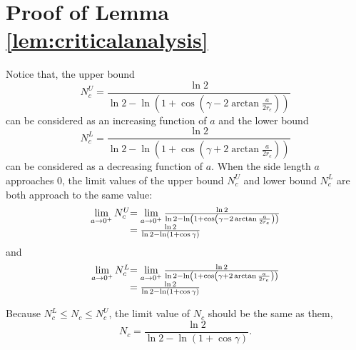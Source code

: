 \documentclass[final]{IEEEtran}
\begin{document}
\section{Proof of Lemma \ref{lem:criticalanalysis}}\label{app:criticalanalysis}
\indent Notice that, the upper bound \begin{equation}
\displaystyle N_c^U=\displaystyle\frac{\ln 2}{\ln 2-\ln(1+\cos(\gamma-2\arctan \frac{a}{2r_e}))}
\end{equation}
can be considered as an increasing function of $a$ and the lower bound
\begin{equation}
    N_c^L=\frac{\ln 2}{\ln 2-\ln(1+\cos(\gamma+2\arctan \frac{a}{2r_e}))}
\end{equation}
can be considered as a decreasing function of $a$. When the side length $a$ approaches 0, the limit values of the upper bound $N_c^{U}$ and lower bound $N_c^{L}$ are both approach to the same value:
\begin{equation}
\begin{array}{r@{}l}
\lim\limits_{a\rightarrow 0^+} N_c^U&=\lim\limits_{a\rightarrow 0^+}\frac{\ln 2}{\ln 2-\ln(1+\cos(\gamma-2\arctan \frac{a}{2r_e}))}\\
&=\frac{\ln 2}{\ln 2-\ln(1+\cos\gamma)}
\end{array}
\end{equation}
and 
\begin{equation}
\begin{array}{r@{}l}
\lim\limits_{a\rightarrow 0^+} N_c^L&=\lim\limits_{a\rightarrow 0^+}\frac{\ln 2}{\ln 2-\ln(1+\cos(\gamma+2\arctan \frac{a}{2r_e}))}\\
&=\frac{\ln 2}{\ln 2-\ln(1+\cos\gamma)}
\end{array}
\end{equation}

Because $N_c^{L}\leq N_c\leq N_c^U$, the limit value of $N_c$ should be the same as them, \ie
\begin{equation}
    N_c=\displaystyle\frac{\ln 2}{\ln 2-\ln(1+\cos\gamma)}.
\end{equation}
\end{document}
